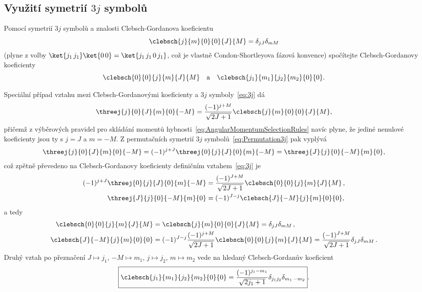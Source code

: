 \subsection{Využití symetrií $3j$ symbolů}
Pomocí symetrií $3j$ symbolů a znalosti Clebsch-Gordanova koeficientu 
\begin{equation}
    \clebsch{j}{m}{0}{0}{J}{M}=\delta_{jJ}\delta_{mM}
\end{equation}
(plyne z volby $\ket{j_{1}\,j_{1}}\ket{0\,0}=\ket{j_{1}\,j_{1}\,0\,j_{1}}$, 
což je vlastně Condon-Shortleyova fázová konvence) spočítejte Clebsch-Gordanovy koeficienty
\begin{equation}
    \clebsch{0}{0}{j}{m}{J}{M}\quad\mathrm{a}\quad\clebsch{j_{1}}{m_{1}}{j_{2}}{m_{2}}{0}{0}.
\end{equation}

\begin{solution}
	Speciální případ vztahu mezi Clebsch-Gordanovými koeficienty a $3j$ symboly~\eqref{eq:3j} dá
	\begin{align}
		\threej{j}{0}{J}{m}{0}{-M}=\frac{(-1)^{j+M}}{\sqrt{2J+1}}\clebsch{j}{m}{0}{0}{J}{M},
	\end{align}
	přičemž z výběrových pravidel pro skládání momentů hybnosti~\eqref{eq:AngularMomentumSelectionRules} navíc plyne, že jediné nenulové koeficienty jsou ty s $j=J$ a $m=-M$.
	Z permutačních symetrií $3j$ symbolů~\eqref{eq:Permutation3j} pak vyplývá
	\begin{equation}
		\threej{j}{0}{J}{m}{0}{-M}
			=(-1)^{j+J}\threej{0}{j}{J}{0}{m}{-M}
			=\threej{J}{j}{0}{-M}{m}{0},
	\end{equation}
	což zpětně převedeno na Clebsch-Gordanovy koeficienty definičním vztahem~\eqref{eq:3j} je
	\begin{align*}
		(-1)^{j+J}\threej{0}{j}{J}{0}{m}{-M}
			&=\frac{(-1)^{J+M}}{\sqrt{2J+1}}\clebsch{0}{0}{j}{m}{J}{M}\,,\\
		\threej{J}{j}{0}{-M}{m}{0}
			&=(-1)^{J-j}\clebsch{J}{-M}{j}{m}{0}{0},
	\end{align*}
	a tedy
    \begin{subequations}
        \begin{align}
            \clebsch{0}{0}{j}{m}{J}{M}
                &=\clebsch{j}{m}{0}{0}{J}{M}=\delta_{jJ}\delta_{mM}\,,\\
            \clebsch{J}{-M}{j}{m}{0}{0}
                &=(-1)^{J-j}\frac{(-1)^{j+M}}{\sqrt{2J+1}}\clebsch{0}{0}{j}{m}{J}{M}
                 =\frac{(-1)^{J+M}}{\sqrt{2J+1}}\delta_{jJ}\delta_{mM}\,.
        \end{align}            
    \end{subequations}
	Druhý vztah po přeznačení
	$J\mapsto j_{1}$, $-M\mapsto m_{1}$, $j\mapsto j_{2}$, $m\mapsto m_{2}$ 
	vede na hledaný Clebsch-Gordanův koeficient
	\begin{equation}
		\label{eq:ClebschGordan00}
		\boxed{
			\clebsch{j_{1}}{m_{1}}{j_{2}}{m_{2}}{0}{0}
				=\frac{(-1)^{j_{1}-m_{1}}}{\sqrt{2j_{1}+1}}\delta_{j_{1}j_{2}}\delta_{m_{1}\,-m_{2}}
		}.
	\end{equation}
\end{solution}